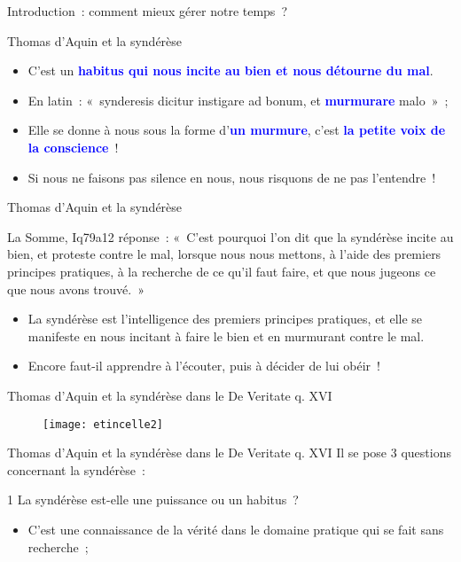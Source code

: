 \documentclass[11pt,xcolor=dvipsname,ignorenonframetext,handout]{beamer}
\begin{document}
\begin{frame}{Introduction~: comment mieux gérer notre temps~?}
\begin{frame}{Thomas d'Aquin et la syndérèse}
\begin{itemize}
        \item C'est un \textcolor{blue}{\textbf{habitus qui nous incite au bien et nous détourne du mal}}.
        \item En latin~: «~synderesis dicitur instigare ad bonum, et \textcolor{blue}{\textbf{murmurare}} malo~»~;
        \item Elle se donne à nous sous la forme d'\textcolor{blue}{\textbf{un murmure}}, c'est \textcolor{blue}{\textbf{la petite voix de la conscience}}~!
        \item Si nous ne faisons pas silence en nous, nous risquons de ne pas l'entendre~!
    \end{itemize}
\end{frame}
\begin{frame}{Thomas d'Aquin et la syndérèse}
    \begin{block}{La Somme, Iq79a12 réponse~:}
        \rightskip=0pt\leftskip=0pt
        «~C'est pourquoi l'on dit que la syndérèse incite au bien, et proteste contre le mal, lorsque nous nous mettons, à l'aide des premiers principes pratiques, à la recherche de ce qu'il faut faire, et que nous jugeons ce que nous avons trouvé.~»
    \end{block}
    \begin{itemize}
        \rightskip=0pt\leftskip=0pt
        \item La syndérèse est l'intelligence des premiers principes pratiques, et elle se manifeste en nous incitant à faire le bien et en murmurant contre le mal.
        \item Encore faut-il apprendre à l'écouter, puis à décider de lui obéir~!
    \end{itemize}
\end{frame}
\begin{frame}{Thomas d'Aquin et la syndérèse dans le De Veritate q. XVI}
    {
        \begin{figure}
          \centering
          \texttt{[image: etincelle2]}
        \end{figure}
          }    
\end{frame}
\begin{frame}{Thomas d'Aquin et la syndérèse dans le De Veritate q. XVI}
    \rightskip=0pt\leftskip=0pt
    Il se pose 3 questions concernant la syndérèse~:
    \begin{block}{1 La syndérèse est-elle une puissance ou un habitus~?}
        \begin{itemize}
            \rightskip=0pt\leftskip=0pt
            \item C'est une connaissance de la vérité dans le domaine pratique qui se fait sans recherche~;

\end{itemize}
\end{block}
\end{frame}
\end{frame}
\end{document}
